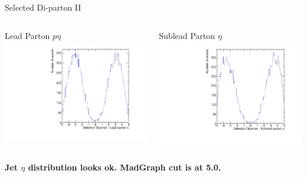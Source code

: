 \documentclass[8pt]{beamer}
\begin{document}
\begin{frame}{Selected Di-parton II}

\begin{columns}

  \centering

  \begin{block}{Lead Parton $p\eta$}
    \centering
    \includegraphics[width=0.8\linewidth]{img/SelDiParton_Parton1_Eta.pdf}
  \end{block}
  
  \centering
 
  \begin{block}{Sublead Parton $\eta$}
    \centering
    \includegraphics[width=0.8\linewidth]{img/SelDiParton_Parton2_Eta.pdf}
  \end{block}

\end{columns}

\begin{center}
\textbf{Jet $\eta$ distribution looks ok. MadGraph cut is at 5.0.}
\end{center}

\end{frame}
\end{document}
